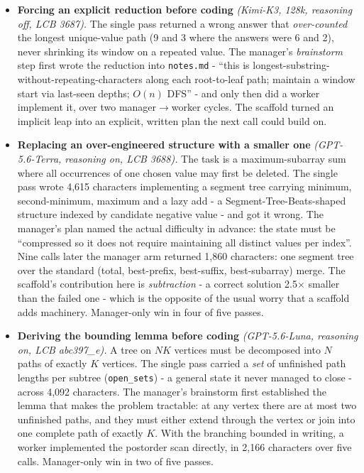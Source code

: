 \documentclass[11pt]{article}
\begin{document}
\begin{itemize}
  \item \textbf{Forcing an explicit reduction before coding} \textit{(Kimi-K3, 128k,
  reasoning off, LCB 3687).} The single pass returned a wrong answer that
  \textit{over-counted} the longest unique-value path (9 and 3 where the answers were 6
  and 2), never shrinking its window on a repeated value. The manager's \textit{brainstorm}
  step first wrote the reduction into \texttt{notes.md} - ``this is
  longest-substring-without-repeating-characters along each root-to-leaf path; maintain a
  window start via last-seen depths; $O(n)$ DFS'' - and only then did a worker implement
  it, over two manager$\to$worker cycles. The scaffold turned an implicit leap into an
  explicit, written plan the next call could build on.

  \item \textbf{Replacing an over-engineered structure with a smaller one}
  \textit{(GPT-5.6-Terra, reasoning on, LCB 3688).} The task is a maximum-subarray sum
  where all occurrences of one chosen value may first be deleted. The single pass wrote
  4{,}615 characters implementing a segment tree carrying minimum, second-minimum, maximum
  and a lazy add - a Segment-Tree-Beats-shaped structure indexed by candidate negative
  value - and got it wrong. The manager's plan named the actual difficulty in advance: the
  state must be ``compressed so it does not require maintaining all distinct values per
  index''. Nine calls later the manager arm returned 1{,}860 characters: one
  segment tree over the standard (total, best-prefix, best-suffix, best-subarray) merge.
  The scaffold's contribution here is \textit{subtraction} - a correct solution 2.5$\times$
  smaller than the failed one - which is the opposite of the usual worry that a scaffold
  adds machinery. Manager-only win in four of five passes.

  \item \textbf{Deriving the bounding lemma before coding} \textit{(GPT-5.6-Luna, reasoning
  on, LCB abc397\_e).} A tree on $NK$ vertices must be decomposed into $N$ paths of exactly
  $K$ vertices. The single pass carried a \textit{set} of unfinished path lengths per
  subtree (\texttt{open\_sets}) - a general state it never managed to close - across 4{,}092
  characters. The manager's brainstorm first established the lemma that makes the problem
  tractable: at any vertex there are at most two unfinished paths, and they must
  either extend through the vertex or join into one complete path of exactly $K$. With the
  branching bounded in writing, a worker implemented the postorder scan directly, in 2{,}166
  characters over five calls. Manager-only win in two of five passes.


\end{itemize}
\end{document}

